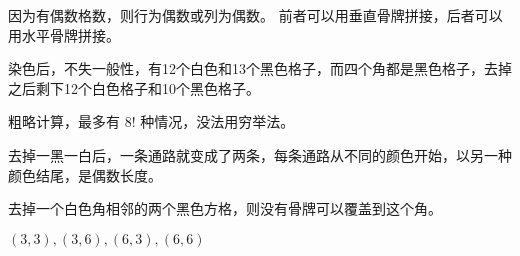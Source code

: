 {{        %
        \begin{practices}
            因为有偶数格数，则行为偶数或列为偶数。
            前者可以用垂直骨牌拼接，后者可以用水平骨牌拼接。
        \end{practices}

        \begin{practices}
            染色后，不失一般性，有12个白色和13个黑色格子，而四个角都是黑色格子，去掉之后剩下12个白色格子和10个黑色格子。
        \end{practices}

        \begin{practices}
            粗略计算，最多有 $8!$ 种情况，没法用穷举法。
        \end{practices}

        \begin{practices}
            去掉一黑一白后，一条通路就变成了两条，每条通路从不同的颜色开始，以另一种颜色结尾，是偶数长度。
        \end{practices}

        \begin{practices}
            去掉一个白色角相邻的两个黑色方格，则没有骨牌可以覆盖到这个角。
        \end{practices}

        \begin{practices}
            $(3, 3), (3, 6) , (6, 3), (6, 6)$
        \end{practices}
    }
}